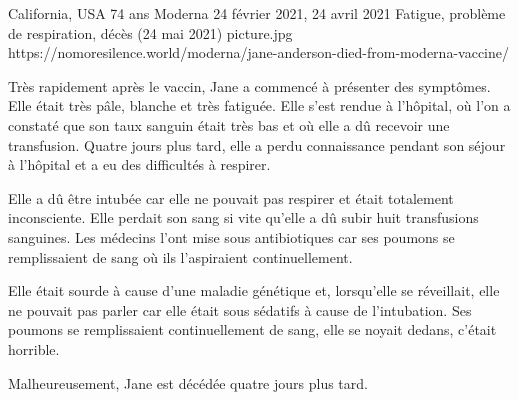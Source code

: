 {California, USA}
{74 ans}
{Moderna}
{24 février 2021, 24 avril 2021}
{Fatigue, problème de respiration, décès (24 mai 2021)}
{picture.jpg}
{https://nomoresilence.world/moderna/jane-anderson-died-from-moderna-vaccine/}
{

Très rapidement après le vaccin, Jane a commencé à présenter des symptômes. Elle
était très pâle, blanche et très fatiguée. Elle s'est rendue à l'hôpital, où
l'on a constaté que son taux sanguin était très bas et où elle a dû recevoir une
transfusion. Quatre jours plus tard, elle a perdu connaissance pendant son
séjour à l'hôpital et a eu des difficultés à respirer.

Elle a dû être intubée car elle ne pouvait pas respirer et était totalement
inconsciente. Elle perdait son sang si vite qu'elle a dû subir huit transfusions
sanguines. Les médecins l'ont mise sous antibiotiques car ses poumons se
remplissaient de sang où ils l'aspiraient continuellement.

Elle était sourde à cause d'une maladie génétique et, lorsqu'elle se réveillait,
elle ne pouvait pas parler car elle était sous sédatifs à cause de
l'intubation. Ses poumons se remplissaient continuellement de sang, elle se
noyait dedans, c'était horrible.

Malheureusement, Jane est décédée quatre jours plus tard.

}
